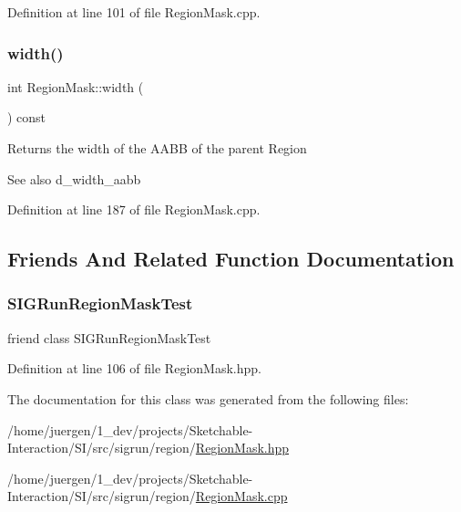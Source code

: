 Definition at line 101 of file Region\+Mask.\+cpp.

\mbox{\label{class_region_mask_a2f2d1b44819b5a0ef89c24306786a4ad}} 
\subsubsection{\texorpdfstring{width()}{width()}}
{\footnotesize\ttfamily int Region\+Mask\+::width (\begin{DoxyParamCaption}{ }\end{DoxyParamCaption}) const}

\begin{DoxyReturn}{Returns}
the width of the A\+A\+BB of the parent Region
\end{DoxyReturn}
\begin{DoxySeeAlso}{See also}
d\+\_\+width\+\_\+aabb 
\end{DoxySeeAlso}


Definition at line 187 of file Region\+Mask.\+cpp.



\subsection{Friends And Related Function Documentation}
\mbox{\label{class_region_mask_a32389378c4d8a7515eb9e363d10fc879}} 
\subsubsection{\texorpdfstring{SIGRunRegionMaskTest}{SIGRunRegionMaskTest}}
{\footnotesize\ttfamily friend class S\+I\+G\+Run\+Region\+Mask\+Test\hspace{0.3cm}{\ttfamily [friend]}}



Definition at line 106 of file Region\+Mask.\+hpp.



The documentation for this class was generated from the following files\+:\begin{DoxyCompactItemize}
\item 
/home/juergen/1\+\_\+dev/projects/\+Sketchable-\/\+Interaction/\+S\+I/src/sigrun/region/\mbox{\hyperlink{_region_mask_8hpp}{Region\+Mask.\+hpp}}\item 
/home/juergen/1\+\_\+dev/projects/\+Sketchable-\/\+Interaction/\+S\+I/src/sigrun/region/\mbox{\hyperlink{_region_mask_8cpp}{Region\+Mask.\+cpp}}\end{DoxyCompactItemize}
